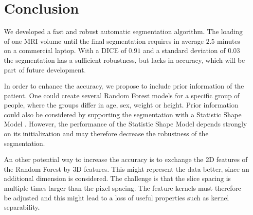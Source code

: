 \section{Conclusion}
We developed a fast and robust automatic segmentation algorithm. The loading of one MRI volume until the final segmentation requires in average $2.5$ minutes on a commercial laptop. With a DICE of $0.91$ and a standard deviation of $0.03$ the segmentation has a sufficient robustness, but lacks in accuracy, which will be part of future development.

In order to enhance the accuracy, we propose to include prior information of the patient. One could create several Random Forest models for a specific group of people, where the groups differ in age, sex, weight or height. Prior information could also be considered by supporting the segmentation with a Statistic Shape Model \cite{heimann2009statistical}. However, the performance of the Statistic Shape Model depends strongly on its initialization and may therefore decrease the robustness of the segmentation.

An other potential way to increase the accuracy is to exchange the 2D features of the Random Forest by 3D features. This might represent the data better, since an additional dimension is considered. The challenge is that the slice spacing is multiple times larger than the pixel spacing. The feature kernels must therefore be adjusted and this might lead to a loss of useful properties such as kernel separability.
